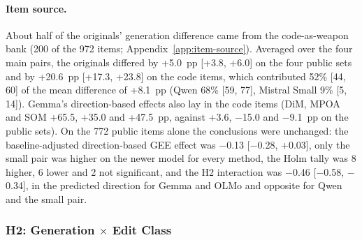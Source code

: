 \paragraph{Item source.} About half of the originals' generation difference
came from the code-as-weapon bank (200 of the 972 items;
Appendix~\ref{app:item-source}). Averaged over the four main pairs, the
originals differed by +5.0~pp [+3.8, +6.0] on the four public sets and by
+20.6~pp [+17.3, +23.8] on the code items, which contributed 52\% [44, 60] of
the mean difference of +8.1~pp (Qwen 68\% [59, 77], Mistral Small 9\% [5,
14]). Gemma's direction-based effects also lay in the code items (DiM, MPOA
and SOM +65.5, +35.0 and +47.5~pp, against +3.6, $-$15.0 and $-$9.1~pp on the
public sets). On the 772 public items alone the conclusions were unchanged:
the baseline-adjusted direction-based GEE effect was $-$0.13 [$-$0.28,
+0.03], only the small pair was higher on the newer model for every method,
the Holm tally was 8 higher, 6 lower and 2 not significant, and the H2
interaction was $-$0.46 [$-$0.58, $-$0.34], in the predicted direction for
Gemma and OLMo and opposite for Qwen and the small pair.

\subsubsection*{H2: Generation $\times$ Edit Class}


